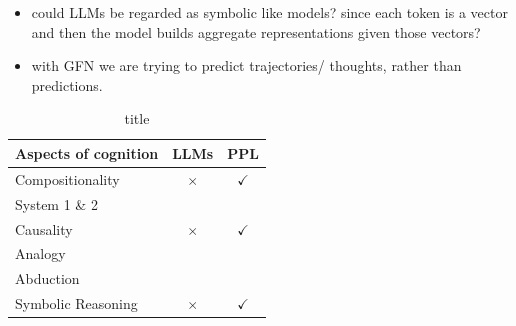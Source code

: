 




\begin{itemize}
    \item could LLMs be regarded as symbolic like models? since each token is a vector and then the model builds aggregate representations given those vectors?
    \item with GFN we are trying to predict trajectories/ thoughts, rather than predictions.
\end{itemize}



\begin{table}
    \centering
    \begin{tabular}{|l|c|c|}
        \hline
        \textbf{Aspects of cognition} & \textbf{LLMs} & \textbf{PPL} \\\hline
        Compositionality & $\times$ & $\checkmark$ \\\hline
        System 1 \& 2    &          & \\\hline
        Causality        & $\times$ & $\checkmark$ \\\hline
        Analogy          &          & \\\hline
        Abduction        &          & \\\hline
        Symbolic Reasoning & $\times$ & $\checkmark$ \\\hline
        
    \end{tabular}
    \caption{title}
    \label{}
\end{table}

